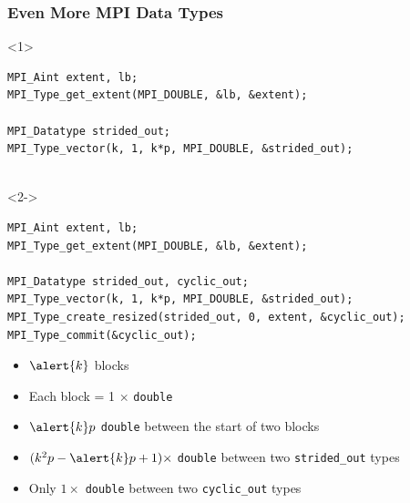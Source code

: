 \documentclass[xcolor={rgb,x11names,svgnames},rgb,x11names,svgnames]{beamer}
\newenvironment{wider}{%
\begin{adjustwidth}{-0.6cm}{}%
  \begin{minipage}{12cm}%
}{%
\end{minipage}%
\end{adjustwidth}%
}
\begin{document}
\begin{frame}[label=conversion,fragile]
\frametitle{Even More MPI Data Types}

\begin{overlayarea}{12cm}{3.5cm}
\begin{wider}
  \begin{onlyenv}<1>
\begin{verbatim}
MPI_Aint extent, lb;
MPI_Type_get_extent(MPI_DOUBLE, &lb, &extent);

MPI_Datatype strided_out;
MPI_Type_vector(k, 1, k*p, MPI_DOUBLE, &strided_out);


\end{verbatim}
\end{onlyenv}

\begin{onlyenv}<2->
\begin{verbatim}
MPI_Aint extent, lb;
MPI_Type_get_extent(MPI_DOUBLE, &lb, &extent);

MPI_Datatype strided_out, cyclic_out;
MPI_Type_vector(k, 1, k*p, MPI_DOUBLE, &strided_out);
MPI_Type_create_resized(strided_out, 0, extent, &cyclic_out);
MPI_Type_commit(&cyclic_out);
\end{verbatim}
\end{onlyenv}
\end{wider}
\end{overlayarea}

\begin{itemize}
\item $\alert{k}$ blocks
\item Each block = 1 $\times$ \texttt{double}
\item $\alert{k}p$ \texttt{double} between the start of two blocks
\item<only@1> $(k^2p-\alert{k}p+1) \times$ \texttt{double} between two \texttt{strided_out} types
\item<only@2-> Only $1 \times$ \texttt{double} between two \texttt{cyclic_out} types
\end{itemize}

\end{frame}
\end{document}
